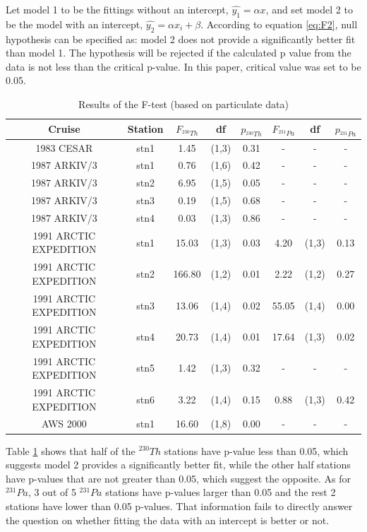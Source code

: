 \documentclass[paper=a4, fontsize=11pt]{scrartcl} %
\numberwithin{equation}{section} %
\numberwithin{figure}{section} %
\numberwithin{table}{section} %
\begin{document}
Let  model 1 to be the fittings without an intercept, $\hat {y_{1}}=\alpha x$, and set model 2 to be the model with an intercept, $\hat {y_{2}}=\alpha x_{i}+\beta$. According to equation \ref{eq:F2}, null hypothesis can be specified as: model 2 does not provide a significantly better fit than model 1. The hypothesis will be rejected if the calculated p value from the data is not less than the critical p-value. In this paper, critical value was set to be 0.05.

\begin{table}[!h]
\caption{Results of the F-test (based on particulate data)}%
\centering
\begin{tabular}{ |c|c|c|c|c|c|c|c|}
\hline
 Cruise &Station&$F_{^{230}Th}$&df\footnotemark[2]&$p_{^{230}Th}$&$F_{^{231}Pa}$&df&$p_{^{231}Pa}$\\
\hline
1983 CESAR  &stn1&1.45&(1,3)&0.31&-&-&-\\1987 ARKIV/3&stn1&0.76&(1,6)&0.42&-&-&-\\
1987 ARKIV/3&stn2&6.95&(1,5)&0.05&-&-&-\\
1987 ARKIV/3&stn3&0.19&(1,5)&0.68&-&-&-\\
1987 ARKIV/3&stn4&0.03&(1,3)&0.86&-&-&-\\
1991 ARCTIC EXPEDITION&stn1&15.03&(1,3)&0.03&4.20&(1,3)&0.13\\
1991 ARCTIC EXPEDITION&stn2&166.80&(1,2)&0.01&2.22&(1,2)&0.27\\
1991 ARCTIC EXPEDITION&stn3&13.06&(1,4)&0.02&55.05&(1,4)&0.00\\
1991 ARCTIC EXPEDITION&stn4&20.73&(1,4)&0.01&17.64&(1,3)&0.02\\
1991 ARCTIC EXPEDITION&stn5&1.42&(1,3)&0.32&-&-&-\\
1991 ARCTIC EXPEDITION&stn6&3.22&(1,4)&0.15&0.88&(1,3)&0.42\\
AWS 2000&stn1&16.60&(1,8)&0.00&-&-&-\\
\hline
\end{tabular}
\label{tab:pvalue}
\end{table}

Table \ref{tab:pvalue} shows that half of the $^{230}Th$ stations have p-value less than 0.05, which suggests model 2 provides a significantly better fit, while the other half stations have p-values that are not greater than 0.05, which suggest the opposite. As for $^{231}Pa$, 3 out of 5 $^{231}Pa$ stations have p-values larger than 0.05 and the rest 2 stations have lower than 0.05 p-values. That information fails to directly answer the question on whether fitting the data with an intercept is better or not. 
\end{document}
